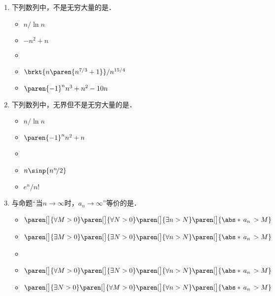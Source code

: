 \begin{enumerate}
\item 下列数列中，不是无穷大量的是\uline{\makebox[8em]{}}．
  \begin{itemize}
    \renewcommand{\labelitemi}{\faCircleThin}
  \item \(n/\!\ln n\)
  \item \(-n^2 + n\)
    \ifshowsol
    \item[\faCircle]
    \else
    \item
    \fi
    \(\brkt{n\paren{n^{7/3}+1}}/n^{15/4}\)
  \item \(\paren{-1}^n n^3 + n^2 - 10n\)
  \end{itemize}

\item 下列数列中，无界但不是无穷大量的是\uline{\makebox[6em]{}}．
  \begin{itemize}
    \renewcommand{\labelitemi}{\faCircleThin}
  \item \(n/\!\ln n\)
  \item \(\paren{-1}^n n^2 + n\)
    \ifshowsol
    \item[\faCircle]
    \else
    \item
    \fi
    \(n \sinp{n^n\!/2}\)
  \item \(e^n\!/n!\)
  \end{itemize}

\item 与命题“当\(n\to\infty\)时，\(a_n\to\infty\)”等价的是\uline{\makebox[10em]{}}．
  \begin{itemize}
    \renewcommand{\labelitemi}{\faCircleThin}
  \item \(
    \paren[\big]{\forall M > 0}
    \paren[\big]{\forall N > 0}
    \paren[\big]{\exists n > N}
    \paren[\big]{\abs*{\,a_n\,} > M}
    \)
  \item \(
    \paren[\big]{\exists M > 0}
    \paren[\big]{\exists N > 0}
    \paren[\big]{\forall n > N}
    \paren[\big]{\abs*{\,a_n\,} > M}
    \)
    \ifshowsol
    \item[\faCircle]
    \else
    \item
    \fi
    \(
    \paren[\big]{\forall M > 0}
    \paren[\big]{\exists N > 0}
    \paren[\big]{\forall n > N}
    \paren[\big]{\abs*{\,a_n\,} > M}
    \)
  \item \(
    \paren[\big]{\exists N > 0}
    \paren[\big]{\forall M > 0}
    \paren[\big]{\forall n > N}
    \paren[\big]{\abs*{\,a_n\,} > M}
    \)
  \end{itemize}


\end{enumerate}
